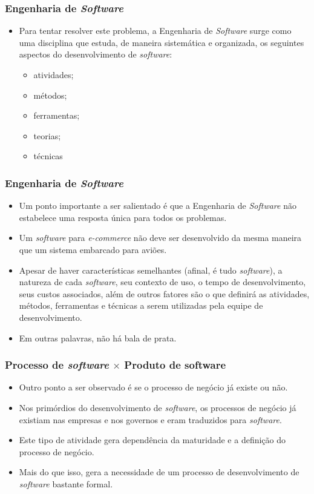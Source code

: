 \documentclass[11pt]{beamer}
\begin{document}
   \begin{frame}
      \frametitle{Engenharia de \textit{Software}}
      \begin{itemize}
        \item Para tentar resolver este problema, a Engenharia de \textit{Software} surge como uma disciplina que estuda, de maneira sistemática e organizada, os seguintes aspectos do desenvolvimento de \textit{software}:
        \begin{itemize}
           \item atividades;
           \item métodos;
           \item ferramentas;
           \item teorias;
           \item técnicas
        \end{itemize}
      \end{itemize}
   \end{frame}

   \begin{frame}
      \frametitle{Engenharia de \textit{Software}}
      \begin{itemize}
        \item Um ponto importante a ser salientado é que a Engenharia de \textit{Software} não estabelece uma resposta única para todos os problemas.
        \item Um \textit{software} para \textit{e-commerce} não deve ser desenvolvido da mesma maneira que um sistema embarcado para aviões.
        \item Apesar de haver características semelhantes (afinal, é tudo \textit{software}), a natureza de cada \textit{software}, seu contexto de uso, o tempo de desenvolvimento, seus custos associados, além de outros fatores são o que definirá as atividades, métodos, ferramentas e técnicas a serem utilizadas pela equipe de desenvolvimento.
        \item Em outras palavras, não há bala de prata.
      \end{itemize}
   \end{frame}
    
    \begin{frame}
      \frametitle{Processo de \textit{software} $\times$ Produto de software}
      \begin{itemize}
        \item Outro ponto a ser observado é se o processo de negócio já existe ou não.
        \item Nos primórdios do desenvolvimento de \textit{software}, os processos de negócio já existiam nas empresas e nos governos e eram traduzidos para \textit{software}.
        \item Este tipo de atividade gera dependência da maturidade e a definição do processo de negócio.
        \item Mais do que isso, gera a necessidade de um processo de desenvolvimento de \textit{software} bastante formal.
      \end{itemize}
    \end{frame}	    
    
\end{document}
